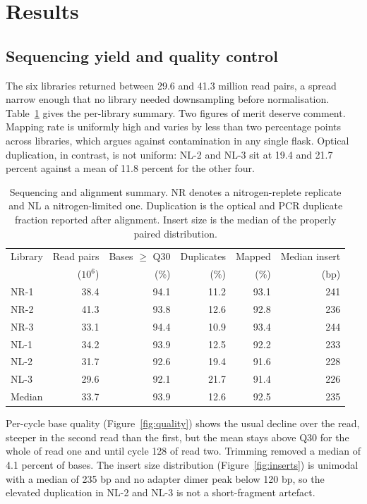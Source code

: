 \section{Results}
\label{sec:results}

\subsection{Sequencing yield and quality control}

The six libraries returned between 29.6 and 41.3 million read pairs, a spread
narrow enough that no library needed downsampling before normalisation.
Table~\ref{tab:qc} gives the per-library summary. Two figures of merit deserve
comment. Mapping rate is uniformly high and varies by less than two percentage
points across libraries, which argues against contamination in any single
flask. Optical duplication, in contrast, is not uniform: NL-2 and NL-3 sit at
19.4 and 21.7 percent against a mean of 11.8 percent for the other four.

\begin{table}[t]
  \centering
  \caption{Sequencing and alignment summary. NR denotes a nitrogen-replete
  replicate and NL a nitrogen-limited one. Duplication is the optical and PCR
  duplicate fraction reported after alignment. Insert size is the median of the
  properly paired distribution.}
  \label{tab:qc}
  \begin{tabular}{lrrrrr}
    \toprule
    Library & Read pairs & Bases $\geq$ Q30 & Duplicates & Mapped & Median insert \\
            & ($10^{6}$) & (\%) & (\%) & (\%) & (bp) \\
    \midrule
    NR-1 & 38.4 & 94.1 & 11.2 & 93.1 & 241 \\
    NR-2 & 41.3 & 93.8 & 12.6 & 92.8 & 236 \\
    NR-3 & 33.1 & 94.4 & 10.9 & 93.4 & 244 \\
    NL-1 & 34.2 & 93.9 & 12.5 & 92.2 & 233 \\
    NL-2 & 31.7 & 92.6 & 19.4 & 91.6 & 228 \\
    NL-3 & 29.6 & 92.1 & 21.7 & 91.4 & 226 \\
    \midrule
    Median & 33.7 & 93.9 & 12.6 & 92.5 & 235 \\
    \bottomrule
  \end{tabular}
\end{table}

Per-cycle base quality (Figure~\ref{fig:quality}) shows the usual decline over
the read, steeper in the second read than the first, but the mean stays above
Q30 for the whole of read one and until cycle 128 of read two. Trimming removed
a median of 4.1 percent of bases. The insert size distribution
(Figure~\ref{fig:inserts}) is unimodal with a median of 235 bp and no adapter
dimer peak below 120 bp, so the elevated duplication in NL-2 and NL-3 is not
a short-fragment artefact.

